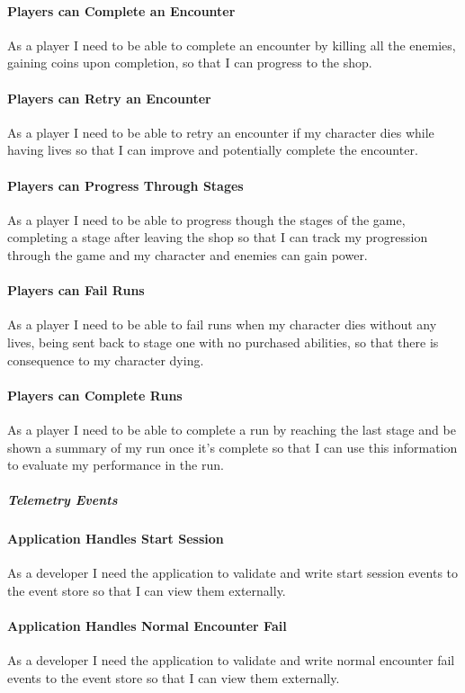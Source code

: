 \paragraph{Players can Complete an Encounter}
As a player I need to be able to complete an encounter by killing all the enemies, gaining coins upon completion, so that I can progress to the shop.

\paragraph{Players can Retry an Encounter}
As a player I need to be able to retry an encounter if my character dies while having lives so that I can improve and potentially complete the encounter.

\paragraph{Players can Progress Through Stages}
As a player I need to be able to progress though the stages of the game, completing a stage after leaving the shop so that I can track my progression through the game and my character and enemies can gain power.

\paragraph{Players can Fail Runs}
As a player I need to be able to fail runs when my character dies without any lives, being sent back to stage one with no purchased abilities, so that there is consequence to my character dying.

\paragraph{Players can Complete Runs}
As a player I need to be able to complete a run by reaching the last stage and be shown a summary of my run once it's complete so that I can use this information to evaluate my performance in the run.

\subparagraph{Telemetry Events}

\paragraph{Application Handles Start Session}
As a developer I need the application to validate and write start session events to the event store so that I can view them externally.

\paragraph{Application Handles Normal Encounter Fail}
As a developer I need the application to validate and write normal encounter fail events to the event store so that I can view them externally.

